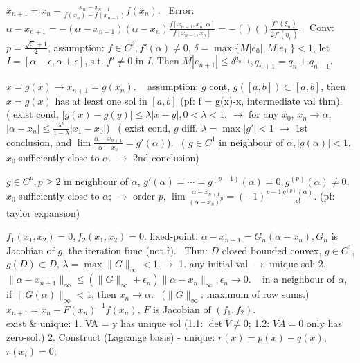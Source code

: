  $x_{n+1} = x_n - \frac{x_n-x_{n-1}}{f(x_n)-f(x_{n-1})}f(x_n) $. ~Error: $\alpha-x_{n+1} = -(\alpha-x_{n-1})(\alpha-x_n)\frac{f[x_{n-1}, x_n, \alpha]}{f[x_{n-1}, x_n]} = -()()\frac{f''(\xi_n)}{2f'(\eta_n)}$. ~Conv: $p = \frac{\sqrt{5}+1}{2}$, assumption: $f\in C^2, f'(\alpha) \ne 0$, $\delta = \max\{M|e_0|, M|e_1|\} < 1$, let $I = [\alpha-\epsilon, \alpha+\epsilon]$, s.t. $f'\ne 0$ in $I$. Then $M|e_{n+1}|\le \delta^{q_{n+1}}, q_{n+1} = q_n+q_{n-1} $.

 $x = g(x) \to x_{n+1}=g(x_n) $. ~ assumption: $g$ cont, $g([a, b])\subset [a, b]$, then $x = g(x)$ has at least one sol in $[a, b]$ (pf: f = g(x)-x, intermediate val thm). ~ ( exist cond, $|g(x)-g(y)| \le \lambda|x-y|, 0<\lambda < 1$. $\to$ for any $x_0 $, $x_n\to\alpha$, $|\alpha - x_n| \le \frac{\lambda^n}{1-\lambda}|x_1-x_0|$) ~( exist cond, $g$ diff. $\lambda = \max|g'| < 1$ $\to$ 1st conclusion, and $\lim\frac{\alpha-x_{n+1}}{\alpha-x_n} = g'(\alpha)$). ~( $g\in C^1 $ in neighbour of $\alpha, |g(\alpha)| < 1$, $x_0$ sufficiently close to $\alpha$. $\to$ 2nd conclusion)

 $g\in C^{p}, p\ge 2 $ in neighbour of $\alpha$, $g'(\alpha) = \cdots = g^{(p-1)}(\alpha) = 0, g^{(p)}(\alpha)\ne 0 $, $x_0$ sufficiently close to $\alpha$; $\to$ order $p$, $\lim\frac{\alpha-x_{n+1}}{(\alpha-x_n)^p} = (-1)^{p-1}\frac{g^{(p)}(\alpha)}{p!} $. (pf: taylor expansion)

 $f_1(x_1, x_2) = 0, f_2(x_1, x_2) = 0 $. fixed-point: $\alpha-x_{n+1} = G_n(\alpha-x_n), G_n $ is Jacobian of $g$, the iteration func (not f). ~Thm: $D$ closed bounded convex, $g\in C^1 $, $g(D)\subset D$, $\lambda = \max\lVert G\rVert_\infty < 1. \to $ 1. any initial val $\to$ unique sol; 2. $\lVert \alpha-x_{n+1}\rVert_{\infty} \le (\lVert G\rVert_\infty +\epsilon_n)\lVert \alpha-x_{n}\rVert_{\infty}, \epsilon_n\to 0 $. ~ in a neighbour of $\alpha$, if $\lVert G(\alpha)\rVert_{\infty} < 1$, then $x_n\to \alpha $. ~($\lVert G\rVert_{\infty}$: maximum of row sums.) ~ $x_{n+1} = x_n-F(x_n)^{-1}f(x_n) $, $F$ is Jacobian of $(f_1, f_2) $. \\[5pt]

 exist \& unique: 1. VA = y has unique sol (1.1: $\det V\ne 0$; 1.2: $VA=0$ only has zero-sol.) 2. Construct (Lagrange basis) - unique: $r(x)=p(x)-q(x)$, $r(x_i) = 0$;

